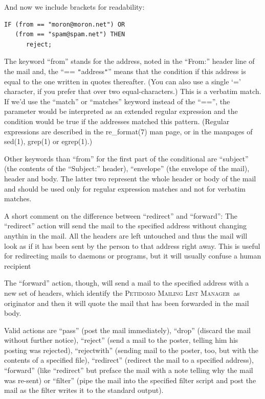 \documentclass[a4paper]{report}
\newcommand{\PetidomoM}{{\scshape Peti\-domo Mail\-ing List Ma\-nager}}
\begin{document}
And now we include brackets for readability:
\begin{verbatim}
IF (from == "moron@moron.net") OR
   (from == "spam@spam.net") THEN
      reject;
\end{verbatim}

The keyword ``from'' stands for the address, noted in the ``From:''
header line of the mail and, the ``== {\tt "}address{\tt "}'' means
that the condition if this address is equal to the one written in
quotes thereafter. (You can also use a single `=' character, if you
prefer that over two equal-characters.) This is a verbatim match. If
we'd use the ``match'' or ``matches'' keyword instead of the ``=='',
the parameter would be interpreted as an extended regular expression
and the condition would be true if the addresses matched this pattern.
(Regular expressions are described in the re\_format(7) man page, or
in the manpages of sed(1), grep(1) or egrep(1).)

Other keywords than ``from'' for the first part of the conditional are
``subject'' (the contents of the ``Subject:'' header), ``envelope''
(the envelope of the mail), header and body. The latter two represent
the whole header or body of the mail and should be used only for
regular expression matches and not for verbatim matches.

A short comment on the difference between ``redirect'' and
``forward'': The ``redirect'' action will send the mail to the
specified address without changing anythin in the mail. All the
headers are left untouched and thus the mail will look as if it has
been sent by the person to that address right away. This is useful for
redirecting mails to daemons or programs, but it will usually confuse
a human recipient

The ``forward'' action, though, will send a mail to the specified
address with a new set of headers, which identify the \PetidomoM\ as
originator and then it will quote the mail that has been forwarded in
the mail body.

Valid actions are ``pass'' (post the mail immediately), ``drop''
(discard the mail without further notice), ``reject'' (send a mail to
the poster, telling him his posting was rejected), ``rejectwith''
(sending mail to the poster, too, but with the contents of a specified
file), ``redirect'' (redirect the mail to a specified address),
``forward'' (like ``redirect'' but preface the mail with a note
telling why the mail was re-sent) or ``filter'' (pipe the mail into
the specified filter script and post the mail as the filter writes it
to the standard output).
\end{document}
